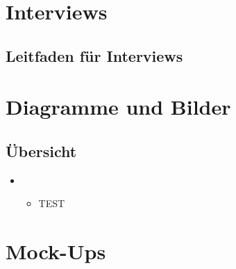 \documentclass[Bachelorarbeit.tex]{subfiles}
\begin{document}
\chapter{Interviews}
\section{Leitfaden für Interviews}

\newpage
\chapter{Diagramme und Bilder}
\label{chap:diagramme_und_bilder}




\section{Übersicht}
\begin{itemize} 
\item {}
\begin{itemize}
\item TEST
\end{itemize}



\end{itemize}

\newpage
\chapter*{Mock-Ups}
\label{sec:mock_ups}
\end{document}
